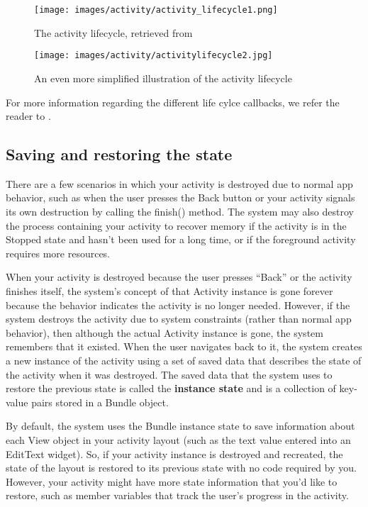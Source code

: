 \begin{figure}
	\texttt{[image: images/activity/activity\_lifecycle1.png]}
	\caption{The activity lifecycle, retrieved from \cite{Developers19}}
	\label{fig:lifeCycle1}
\end{figure}

\begin{figure}
	\texttt{[image: images/activity/activitylifecycle2.jpg]}
		\caption{An even more simplified illustration of the activity lifecycle}
	\label{fig:lifeCycle2}
\end{figure}

For more information regarding the different life cylce callbacks, we refer the reader to \cite{Developers19}.

\subsection{Saving and restoring the state}
\label{sec:saveAndRestoreState}
There are a few scenarios in which your activity is destroyed due to normal app behavior, such as when the user presses the Back button or your activity signals its own destruction by calling the finish() method.
The system may also destroy the process containing your activity to recover memory if the activity is in the Stopped state and hasn't been used for a long time, or if the foreground activity requires more resources.

When your activity is destroyed because the user presses  ``Back'' or the activity finishes itself, the system's concept of that Activity instance is gone forever because the behavior indicates the activity is no longer needed.
However, if the system destroys the activity due to system constraints (rather than normal app behavior), then although the actual Activity instance is gone, the system remembers that it existed.
When the user navigates back to it, the system creates a new instance of the activity using a set of saved data that describes the state of the activity when it was destroyed.
The saved data that the system uses to restore the previous state is called the \textbf{instance state} and is a collection of key-value pairs stored in a Bundle object.

By default, the system uses the Bundle instance state to save information about each View object in your activity layout (such as the text value entered into an EditText widget).
So, if your activity instance is destroyed and recreated, the state of the layout is restored to its previous state with no code required by you.
However, your activity might have more state information that you'd like to restore, such as member variables that track the user's progress in the activity.

